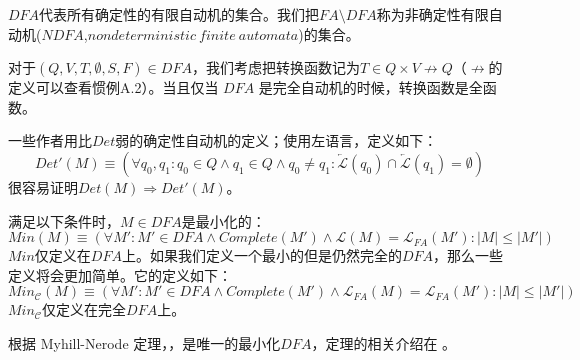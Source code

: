 \begin{definition}[$FA$的确定性]
    $DFA$代表所有确定性的有限自动机的集合。我们把$FA \setminus DFA$称为非确定性有限自动机($NDFA$,$nondeterministic\ finite\ automata$)的集合。
\end{definition}

\begin{convention}[DFA的转换函数]
    对于$(Q,V,T,\emptyset,S,F)\in DFA$，我们考虑把转换函数记为$T\in Q \times V \not\rightarrow Q$（$\not\rightarrow$的定义可以查看惯例A.2）。当且仅当 $DFA$ 是完全自动机的时候，转换函数是全函数。
\end{convention}


\begin{property}[弱确定性自动机]
    一些作者用比$Det$弱的确定性自动机的定义；使用左语言，定义如下：
    $$ Det'(M) \equiv (\forall q_0,q_1 : q_0 \in Q \land q_1 \in Q \land q_0 \not= q_1 : \overleftarrow{\mathcal{L}}(q_0) \cap \overleftarrow{\mathcal{L}}(q_1) = \emptyset ) $$
很容易证明$Det(M) \Rightarrow Det'(M)$。
\end{property}

\begin{definition}
    满足以下条件时，$M\in DFA$是最小化的：
    $$ Min(M) \equiv (\forall M' : M' \in DFA \land Complete(M') \land \mathcal{L}(M) = \mathcal{L}_{FA}(M') : |M| \leq |M'| ) $$
$Min$仅定义在$DFA$上。如果我们定义一个最小的但是仍然完全的$DFA$，那么一些定义将会更加简单。它的定义如下：
\small{ $$ Min_{\mathcal{C}}(M) \equiv ( \forall M':M' \in DFA \land Complete(M') \land \mathcal{L}_{FA}(M) = \mathcal{L}_{FA}(M'): |M| \leq |M'| ) $$ }
$Min_{\mathcal{C}}$仅定义在完全$DFA$上。
\end{definition}

\begin{definition}
    根据 Myhill-Nerode 定理，，是唯一的最小化$DFA$，定理的相关介绍在 \cite{watson1993taxonomyb}。
\end{definition}

